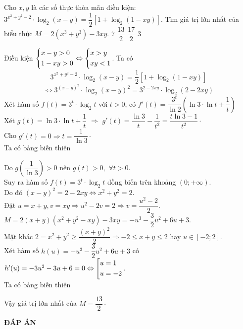 \begin{ex}%
Cho $ x, y $	là các số thực thỏa mãn điều kiện: $ 3^{x^2 + y^2 -2} \cdot \log_2(x-y) = \dfrac{1}{2} \left[ 1 + \log_2(1-xy)\right]$. Tìm giá trị lớn nhất của biểu thức $ M = 2\left(x^3 + y^3\right) - 3xy$.
	\choice
	{$ 7 $}
	{\True $ \dfrac{13}{2} $}
	{$ \dfrac{17}{2} $}
	{$ 3 $}
	\loigiai
	{	Điều kiện $\left\{\begin{aligned}&x-y>0\\&1-xy>0\\\end{aligned}\right. \Leftrightarrow \left\{\begin{aligned}&x>y\\&xy<1\\\end{aligned}\right.$.
		Ta có $$ 3^{x^2 + y^2 -2} \cdot \log_2(x-y) = \dfrac{1}{2} \left[ 1 + \log_2(1-xy)\right]$$
		$$\Leftrightarrow 3^{(x-y)^2} \cdot \log_2(x-y)^2=3^{2-2xy} \cdot \log_2 (2 - 2xy)$$
		Xét hàm số $ f(t) = 3^t \cdot \log_2t  $ với $ t > 0 $, có $ f'(t) = \dfrac{3^t}{\ln 2} \left(\ln3 \cdot \ln t + \dfrac{1}{t}\right) $\\
		Xét $ g(t) =\ln3 \cdot \ln t + \dfrac{1}{t} $ $\Rightarrow$ $g'(t) =  \dfrac{\ln3}{t} -\dfrac{1}{t^2} = \dfrac{t \ln3 - 1}{t^2} \cdot $ \\
		Cho $ g'(t) = 0 \Rightarrow t = \dfrac{1}{\ln 3} \cdot$ \\
		Ta có bảng biến thiên
			\begin{center}
			\end{center}
		Do $ g\left(\dfrac{1}{\ln3}\right) > 0$ nên $ g(t) > 0, $ $ \forall t>0 $.\\
		Suy ra hàm số $ f(t) = 3^t \cdot \log_2t $
		đồng biến trên khoảng $ \left(0; + \infty \right) $.
		\\Do đó $ (x-y)^2 = 2 - 2xy \Leftrightarrow x^2 + y^2 = 2 $.\\
		Đặt $ u = x+y, v = xy \Rightarrow u^2 - 2v = 2 \Rightarrow v = \dfrac{u^2 - 2}{2} $.\\
		$ M = 2(x+y)(x^2 + y^2 -xy) - 3xy = -u^3 - \dfrac{3}{2}u^2 + 6u + 3 $.\\
		Mặt khác $ 2 = x^2 + y^2 \ge \dfrac{(x+y)^2}{2} \Rightarrow -2 \le x+y \le 2  $ hay $ u \in \left[-2;2\right] $.\\
		Xét hàm số $ h(u) = -u^3 - \dfrac{3}{2}u^2 + 6u + 3  $ có $ h'(u) = -3u^2 -3u + 6 = 0 \Leftrightarrow \left[\begin{aligned}&u = 1 \\&u = -2\end{aligned}\right.$.\\
		Ta có bảng biến thiên
		\begin{center}
		\end{center}
	Vậy giá trị lớn nhất của $ M = \dfrac{13}{2} \cdot  $	
	}
\end{ex}
\newpage
\begin{center}
	\textbf{ĐÁP ÁN}
\end{center}
\begin{multicols}{10}
 
\end{multicols}

